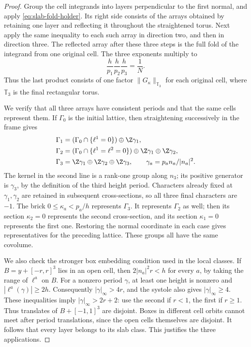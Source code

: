 \begin{proof}
Group the cell integrands into layers perpendicular to the first normal,
and apply \eqref{eq:slab-fold-holder}. Its right side consists of the
arrays obtained by retaining one layer and reflecting it throughout
the straightened torus. Next apply the same inequality to each such
array in direction two, and then in direction three. The reflected
array after these three steps is the full fold of the integrand from
one original cell. The three exponents multiply to
\[
 \frac h{p_1}\frac h{p_2}\frac h{p_3}
       =\frac1N.
\]
Thus the last product consists of one factor
$\|G_\kappa\|_{\mathbb T_3}$ for each original cell, where
$\mathbb T_3$ is the final rectangular torus.

We verify that all three arrays have consistent periods and that the
same cells represent them. If $\Gamma_0$ is the initial lattice, then
straightening successively in the frame gives
\begin{align*}
 \Gamma_1&=(\Gamma_0\cap\{\ell^1=0\})\oplus\Z\gamma_1,\\
 \Gamma_2&=(\Gamma_0\cap\{\ell^1=\ell^2=0\})
                                  \oplus\Z\gamma_1\oplus\Z\gamma_2,\\
 \Gamma_3&=\Z\gamma_1\oplus\Z\gamma_2\oplus\Z\gamma_3,
 \qquad \gamma_a=p_an_a/|n_a|^2.
\end{align*}
The kernel in the second line is a rank-one group along $n_3$; its
positive generator is $\gamma_3$, by the definition of the third
height period. Characters already fixed at $\gamma_1,\gamma_2$ are
retained in subsequent cross-sections, so all three final characters
are $-1$. The brick $0\le\kappa_a<p_a/h$ represents $\Gamma_3$.
It represents $\Gamma_2$ as well; then its section $\kappa_2=0$
represents the second cross-section, and its section $\kappa_1=0$
represents the first one. Restoring the normal coordinate in each
case gives representatives for the preceding lattice. These groups
all have the same covolume.

We also check the stronger box embedding condition used in the local
classes. If $B=y+[-r,r]^3$ lies in an open cell, then
$2|n_a|^2r<h$ for every $a$, by taking the range of $\ell^a$ on $B$.
For a nonzero period $\gamma$, at least one height is nonzero and
$|\ell^a(\gamma)|\ge2h$. Consequently
$|\gamma|_\infty>4r$, and the systole also gives
$|\gamma|_\infty\ge4$. These inequalities imply
$|\gamma|_\infty>2r+2$: use the second if $r<1$, the first if
$r\ge1$. Thus translates of $B+[-1,1]^3$ are disjoint. Boxes in
different cell orbits cannot meet after period translations, since
the open cells themselves are disjoint. It follows that every layer
belongs to its slab class. This justifies the three applications.


\end{proof}

